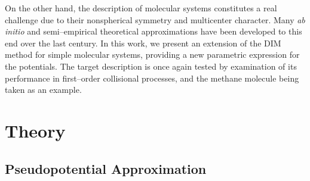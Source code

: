 \documentclass[10pt]{article}
\begin{document}
On the other hand, the description of molecular systems constitutes 
a real challenge due to their nonspherical symmetry and multicenter 
character. Many \textit{ab initio} and semi--empirical theoretical 
approximations \cite{Szabo1996,Helgaker2000,Schaefer2004} have been 
developed to this end over the last century. In this work, we present 
an extension of the DIM method for simple molecular systems, 
providing a new parametric expression for the potentials. The target 
description is once again tested by examination of its performance in 
first--order collisional processes, and the methane molecule being 
taken as an example.


\section{Theory}

\subsection{Pseudopotential Approximation}
\label{sec:PPAs}
\end{document}
